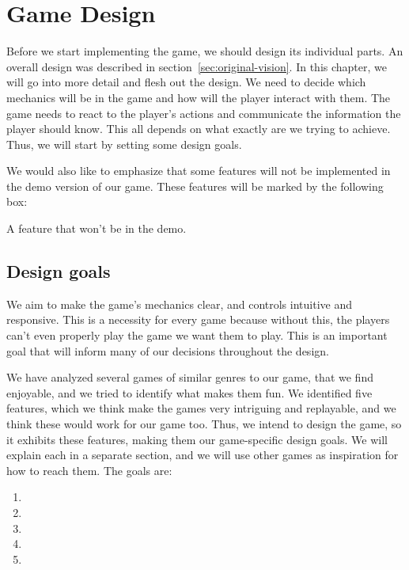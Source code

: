 \chapter{Game Design}\label{game-design}

Before we start implementing the game, we should design its individual parts.
An overall design was described in section~\ref{sec:original-vision}.
In this chapter, we will go into more detail and flesh out the design.
We need to decide which mechanics will be in the game and how will the player interact with them.
The game needs to react to the player's actions and communicate the information the player should know.
This all depends on what exactly are we trying to achieve.
Thus, we will start by setting some design goals.

We would also like to emphasize that some features will not be implemented in the demo version of our game.
These features will be marked by the following box:
\begin{notindemo}
    A feature that won't be in the demo.
\end{notindemo}

\section{Design goals}\label{sec:design-goals}

We aim to make the game's mechanics clear, and controls intuitive and responsive.
This is a necessity for every game because without this, the players can't even properly play the game we want them to play.
This is an important goal that will inform many of our decisions throughout the design.

We have analyzed several games of similar genres to our game, that we find enjoyable, and we tried to identify what makes them fun.
We identified five features, which we think make the games very intriguing and replayable, and we think these would work for our game too.
Thus, we intend to design the game, so it exhibits these features, making them our game-specific design goals.
We will explain each in a separate section, and we will use other games as inspiration for how to reach them.
The goals are:
\begin{enumerate}
    \item {}
    \item {}
    \item {}
    \item {}
    \item {}
\end{enumerate}


